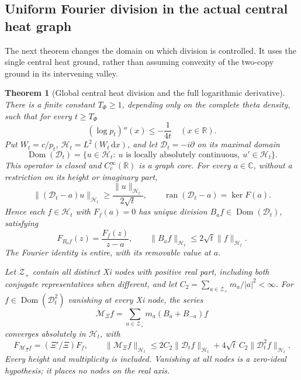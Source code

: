 \documentclass[11pt]{article}
\newtheorem{theorem}{Theorem}
\theoremstyle{remark}\newtheorem{remark}[theorem]{Remark}
\newcommand{\R}{\mathbb R}
\newcommand{\C}{\mathbb C}
\newcommand{\dd}{\,\mathrm d}
\begin{document}
\subsection{Uniform Fourier division in the actual central heat graph}
\label{sec:central-heat-division}

The next theorem changes the domain on which division is controlled.
It uses the single central heat ground, rather than assuming convexity
of the two-copy ground in its intervening valley.

\begin{theorem}[Global central heat division and the full logarithmic derivative]
\label{thm:central-heat-division}
There is a finite constant \(T_\Phi\ge1\), depending only on the
complete theta density, such that for every \(t\ge T_\Phi\)
\[
 (\log p_t)''(x)\le-\frac1{4t}\quad(x\in\R).
                                                               \tag{HD1}
\]
Put \(W_t=c/p_t\), \(\mathcal H_t=L^2(W_t\dd x)\), and let
\(\mathcal D_t=-i\partial\) on its maximal domain
\[
 \operatorname{Dom}(\mathcal D_t)
 =\{u\in\mathcal H_t:\ u\text{ is locally absolutely continuous},
                               \ u'\in\mathcal H_t\}.
\]
This operator is closed and \(C_c^\infty(\R)\) is a graph core.
For every \(a\in\C\), without a restriction on its height or
imaginary part,
\[
 \|(\mathcal D_t-a)u\|_{\mathcal H_t}
          \ge\frac{\|u\|_{\mathcal H_t}}{2\sqrt t},\qquad
 \operatorname{ran}(\mathcal D_t-a)=\ker F(a).                  \tag{HD2}
\]
Hence each \(f\in\mathcal H_t\) with \(F_f(a)=0\) has unique
division \(B_af\in\operatorname{Dom}(\mathcal D_t)\), satisfying
\[
 F_{B_af}(z)=\frac{F_f(z)}{z-a},\qquad
              \|B_af\|_{\mathcal H_t}\le2\sqrt t\|f\|_{\mathcal H_t}.
                                                               \tag{HD3}
\]
The Fourier identity is entire, with its removable value at \(a\).

Let \(\mathcal Z_+\) contain all distinct Xi nodes with positive
real part, including both conjugate representatives when different,
and let \(C_2=\sum_{a\in\mathcal Z_+}m_a/|a|^2<\infty\).
For \(f\in\operatorname{Dom}(\mathcal D_t^2)\) vanishing at every
Xi node, the series
\[
 \mathcal M_\Xi f=\sum_{a\in\mathcal Z_+}m_a(B_a+B_{-a})f
                                                               \tag{HD4}
\]
converges absolutely in \(\mathcal H_t\), with
\[
 F_{\mathcal M_\Xi f}=(\Xi'/\Xi)F_f,\qquad
 \|\mathcal M_\Xi f\|_{\mathcal H_t}
 \le2C_2\|\mathcal D_tf\|_{\mathcal H_t}
          +4\sqrt t\,C_2\|\mathcal D_t^2f\|_{\mathcal H_t}.
                                                               \tag{HD5}
\]
Every height and multiplicity is included. Vanishing at all
nodes is a zero-ideal hypothesis; it places no nodes on the real axis.
\end{theorem}
\end{document}
